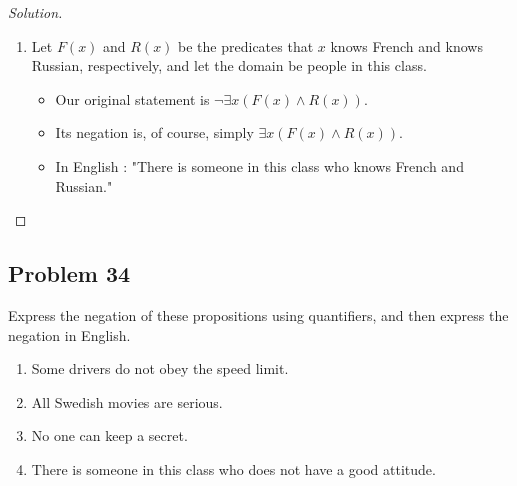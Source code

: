 \documentclass{article}
\newenvironment{solution}{\renewcommand\qedsymbol{}\begin{proof}[Solution]}{\end{proof}}
\begin{document}
\begin{solution}
\begin{enumerate}[leftmargin=16pt, topsep = 8pt]
\item Let $F(x)$ and $R(x)$ be the predicates that $x$ knows French and knows Russian, respectively, and let the domain be people in this class.
\begin{itemize}[leftmargin=0pt, topsep = 0pt]
\item Our original statement is $\neg \exists x(F(x) \land R(x))$.
\item Its negation is, of course, simply $\exists x(F(x) \land R(x))$.
\item In English : "There is someone in this class who knows French and Russian."
\end{itemize}
\end{enumerate}
\end{solution}

\subsection*{Problem 34}
Express the negation of these propositions using quantifiers, and then express the negation in English.

\begin{enumerate}[leftmargin=16pt, topsep = 8pt]
\item Some drivers do not obey the speed limit.
\item All Swedish movies are serious.
\item No one can keep a secret.
\item There is someone in this class who does not have a good attitude.
\end{enumerate}
\end{document}

